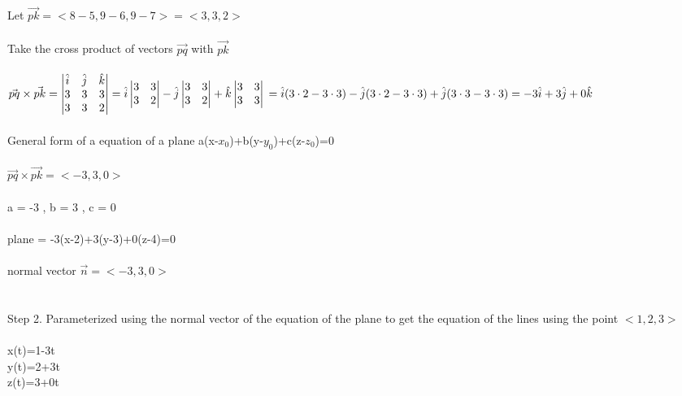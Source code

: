 \documentclass{article}
\begin{document}
\begin{enumerate}[a.]
  Let $\vec{pk} = <8-5,9-6,9-7>=<3,3,2>$\\
  \\
  Take the cross product of vectors $\vec{pq}$ with $\vec{pk}$\\
  \\
  $\vec{pq}\times\vec{pk}=\begin{vmatrix}
\hat{i}&\hat{j}&\hat{k}\\
3&3&3\\
3&3&2\\
\end{vmatrix}=\hat{i}\begin{vmatrix}
3&3\\
3&2\\
\end{vmatrix}-\hat{j}\begin{vmatrix}
3&3\\
3&2\\
\end{vmatrix}+\hat{k}\begin{vmatrix}
3&3\\
3&3\\
\end{vmatrix}\\
=\hat{i}(3 \cdot 2-3 \cdot3)-\hat{j}(3\cdot2-3\cdot3)+\hat{j}(3\cdot3-3\cdot3)
\\=-3\hat{i}+3\hat{j}+0\hat{k}$\\
\\
General form of a equation of a plane a(x-$x_{0}$)+b(y-$y_{0}$)+c(z-$z_{0}$)=0\\
\\
$\vec{pq}\times\vec{pk}=<-3,3,0>$\\
\\
a = -3 , b = 3 , c = 0\\
\\
plane = -3(x-2)+3(y-3)+0(z-4)=0
\\
\\
normal vector $\vec{n}=<-3,3,0>$ \\
\\
\\
Step 2. Parameterized using the normal vector of the equation of the plane to get the equation of the lines using the point $<1,2,3>$\\
\\
x(t)=1-3t\\
y(t)=2+3t\\
z(t)=3+0t\\
  
\end{enumerate}
\end{document}
